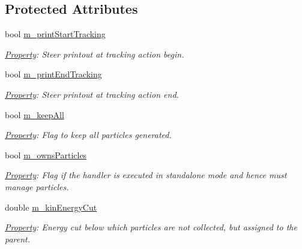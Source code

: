 \subsection*{Protected Attributes}
\begin{DoxyCompactItemize}
\item 
bool \hyperlink{class_d_d4hep_1_1_simulation_1_1_geant4_particle_handler_a1960c5fe6223f3ec578196b79a5aa088}{m\+\_\+print\+Start\+Tracking}
\begin{DoxyCompactList}\small\item\em \hyperlink{class_d_d4hep_1_1_property}{Property}\+: Steer printout at tracking action begin. \end{DoxyCompactList}\item 
bool \hyperlink{class_d_d4hep_1_1_simulation_1_1_geant4_particle_handler_a6d1f66487284fd0d7f61633c5fd891f1}{m\+\_\+print\+End\+Tracking}
\begin{DoxyCompactList}\small\item\em \hyperlink{class_d_d4hep_1_1_property}{Property}\+: Steer printout at tracking action end. \end{DoxyCompactList}\item 
bool \hyperlink{class_d_d4hep_1_1_simulation_1_1_geant4_particle_handler_ab2b6cb17640a8b5cc428b2142965a4e5}{m\+\_\+keep\+All}
\begin{DoxyCompactList}\small\item\em \hyperlink{class_d_d4hep_1_1_property}{Property}\+: Flag to keep all particles generated. \end{DoxyCompactList}\item 
bool \hyperlink{class_d_d4hep_1_1_simulation_1_1_geant4_particle_handler_a81a2c3bad5037dd9fcffdf233f7c69e2}{m\+\_\+owns\+Particles}
\begin{DoxyCompactList}\small\item\em \hyperlink{class_d_d4hep_1_1_property}{Property}\+: Flag if the handler is executed in standalone mode and hence must manage particles. \end{DoxyCompactList}\item 
double \hyperlink{class_d_d4hep_1_1_simulation_1_1_geant4_particle_handler_ad3d0abf4ae9bc3f3176d9f05dab96cf4}{m\+\_\+kin\+Energy\+Cut}
\begin{DoxyCompactList}\small\item\em \hyperlink{class_d_d4hep_1_1_property}{Property}\+: Energy cut below which particles are not collected, but assigned to the parent. \end{DoxyCompactList}\item 

\end{DoxyCompactItemize}
